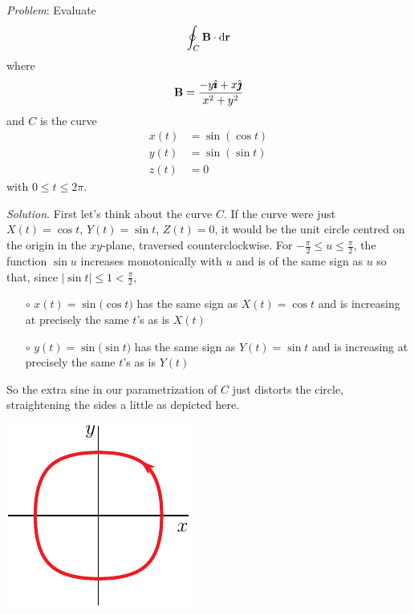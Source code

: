 \begin{eg}\label{eg:greenC}
\noindent\textit{Problem}:
Evaluate
\begin{equation*}
\oint_C\mathbf{B}\cdot\mathrm{d}\mathbf{r}
\end{equation*}
where
\begin{equation*}
\mathbf{B} = \frac{-y\hat{\pmb{\imath}}+x\hat{\pmb{\jmath}}}{x^2+y^2}
\end{equation*}
and $C$ is the curve
\begin{align*}
x(t) &= \sin(\cos t) \\
y(t) &= \sin(\sin t) \\
z(t) &= 0
\end{align*}
with $0\le t\le 2\pi$.

\medskip
\noindent\textit{Solution}.
First let's think about the curve $C$. If the curve were just
$X(t)=\cos t$, $Y(t)=\sin t$, $Z(t)=0$, it would be the unit circle
centred on the origin in the $xy$-plane, traversed counterclockwise.
For $-\frac{\pi}{2}\le u\le \frac{\pi}{2}$, the function $\sin u$ 
increases monotonically with  $u$ and is of the same sign as $u$ so that,  
since $|\sin t|\le 1<\frac{\pi}{2}$,
\begin{itemize}\itemsep1pt \parskip0pt  %
\item[$\circ$]
$x(t) = \sin\big(\cos t)$ has the same sign as $X(t)=\cos t$ and is increasing
at precisely the same $t$'s as is $X(t)$
\item[$\circ$]
$y(t) = \sin\big(\sin t)$ has the same sign as $Y(t)=\sin t$ and is increasing
at precisely the same $t$'s as is $Y(t)$
\end{itemize}
So the extra sine in our 
parametrization of $C$ just distorts the circle, straightening the sides a little
as depicted here.
\begin{nfig}
\begin{center}
    \includegraphics{dcircleA.pdf}
\end{center}
\end{nfig}

\end{eg}
